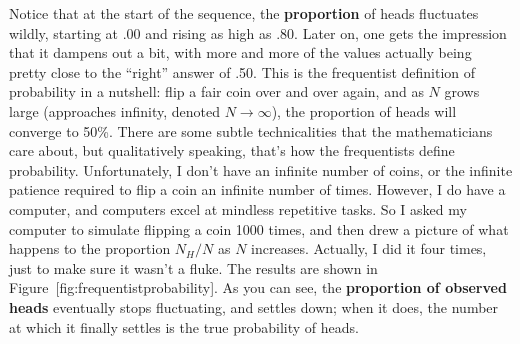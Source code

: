 \documentclass[
]{book}
\begin{document}
Notice that at the start of the sequence, the \textbf{proportion} of heads fluctuates wildly, starting at .00 and rising as high as .80. Later on, one gets the impression that it dampens out a bit, with more and more of the values actually being pretty close to the ``right'' answer of .50. This is the frequentist definition of probability in a nutshell: flip a fair coin over and over again, and as \(N\) grows large (approaches infinity, denoted \(N\rightarrow \infty\)), the proportion of heads will converge to 50\%. There are some subtle technicalities that the mathematicians care about, but qualitatively speaking, that's how the frequentists define probability. Unfortunately, I don't have an infinite number of coins, or the infinite patience required to flip a coin an infinite number of times. However, I do have a computer, and computers excel at mindless repetitive tasks. So I asked my computer to simulate flipping a coin 1000 times, and then drew a picture of what happens to the proportion \(N_H / N\) as \(N\) increases. Actually, I did it four times, just to make sure it wasn't a fluke. The results are shown in Figure~{[}fig:frequentistprobability{]}. As you can see, the \textbf{proportion of observed heads} eventually stops fluctuating, and settles down; when it does, the number at which it finally settles is the true probability of heads.
\end{document}

